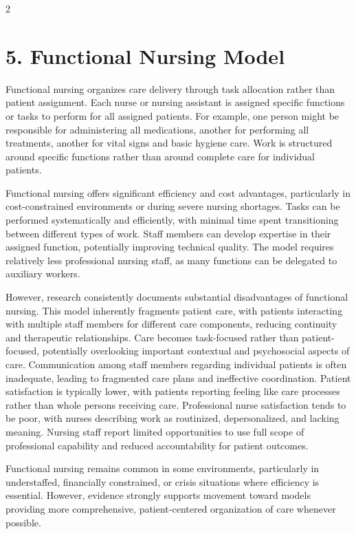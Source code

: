 \documentclass[12pt]{article}
\begin{document}
\begin{multicols}{2}
\section*{5. \quad Functional Nursing Model}

Functional nursing organizes care delivery through task allocation rather than patient assignment. Each nurse or nursing assistant is assigned specific functions or tasks to perform for all assigned patients. For example, one person might be responsible for administering all medications, another for performing all treatments, another for vital signs and basic hygiene care. Work is structured around specific functions rather than around complete care for individual patients.

Functional nursing offers significant efficiency and cost advantages, particularly in cost-constrained environments or during severe nursing shortages. Tasks can be performed systematically and efficiently, with minimal time spent transitioning between different types of work. Staff members can develop expertise in their assigned function, potentially improving technical quality. The model requires relatively less professional nursing staff, as many functions can be delegated to auxiliary workers.

However, research consistently documents substantial disadvantages of functional nursing. This model inherently fragments patient care, with patients interacting with multiple staff members for different care components, reducing continuity and therapeutic relationships. Care becomes task-focused rather than patient-focused, potentially overlooking important contextual and psychosocial aspects of care. Communication among staff members regarding individual patients is often inadequate, leading to fragmented care plans and ineffective coordination. Patient satisfaction is typically lower, with patients reporting feeling like care processes rather than whole persons receiving care. Professional nurse satisfaction tends to be poor, with nurses describing work as routinized, depersonalized, and lacking meaning. Nursing staff report limited opportunities to use full scope of professional capability and reduced accountability for patient outcomes.

Functional nursing remains common in some environments, particularly in understaffed, financially constrained, or crisis situations where efficiency is essential. However, evidence strongly supports movement toward models providing more comprehensive, patient-centered organization of care whenever possible.


\end{multicols}
\end{document}
